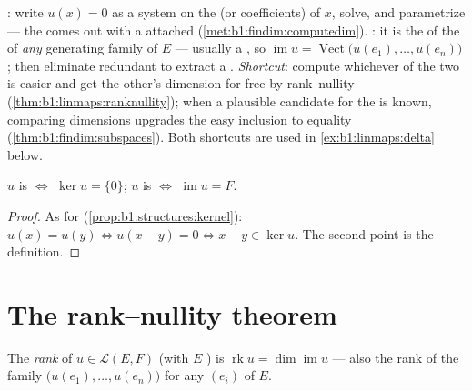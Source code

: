 \begin{method}
\label{met:b1:linmaps:kerim}
\emph{}: write $u(x) = 0$ as a system on the 
(or coefficients) of $x$, solve, and parametrize --- the 
comes out with a  attached
(\cref{met:b1:findim:computedim}). \emph{}: it is the 
of the  of \emph{any} generating family of $E$ ---
usually a , so $\operatorname{im} u =
\operatorname{Vect}\bigl(u(e_1), \dots, u(e_n)\bigr)$; then
eliminate redundant  to extract a . \emph{Shortcut}:
compute whichever of the two is easier and get the other's
dimension for free by rank--nullity
(\cref{thm:b1:linmaps:ranknullity}); when a plausible candidate
 for the  is known, comparing dimensions upgrades
the easy inclusion to equality
(\cref{thm:b1:findim:subspaces}). Both shortcuts are used in
\cref{ex:b1:linmaps:delta} below.
\end{method}

\begin{proposition}\label{prop:b1:linmaps:kernel}
$u$ is  $\iff$ $\ker u = \{0\}$; $u$ is  $\iff$
$\operatorname{im} u = F$.
\end{proposition}

\begin{proof}
As for  (\cref{prop:b1:structures:kernel}): $u(x) = u(y) \iff
u(x - y) = 0 \iff x - y \in \ker u$. The second point is the
definition.
\end{proof}

\section{The rank--nullity theorem}

\begin{definition}\label{def:b1:linmaps:rank}
The \emph{rank} of $u \in \mathcal{L}(E,
F)$ (with $E$ ) is $\operatorname{rk} u = \dim
\operatorname{im} u$ --- also the rank of the family
$\bigl(u(e_1), \dots, u(e_n)\bigr)$ for any  $(e_i)$ of $E$.
\end{definition}

